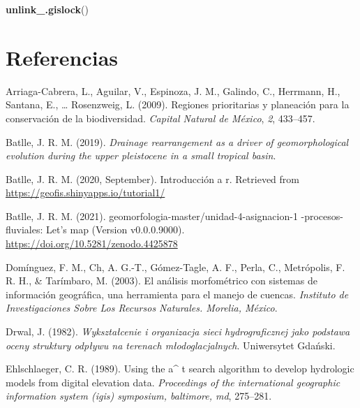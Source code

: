 \documentclass[11pt,]{article}
\newenvironment{Shaded}{\begin{snugshade}}{\end{snugshade}}
\newcommand{\KeywordTok}[1]{\textcolor[rgb]{0.13,0.29,0.53}{\textbf{#1}}}
\newcommand{\NormalTok}[1]{#1}
\begin{document}
\begin{Shaded}
\begin{Highlighting}[]
\KeywordTok{unlink_.gislock}\NormalTok{()}
\end{Highlighting}
\end{Shaded}

\section*{Referencias}\label{referencias}

\hypertarget{refs}{}
\hypertarget{ref-arriaga2009regiones}{}
Arriaga-Cabrera, L., Aguilar, V., Espinoza, J. M., Galindo, C.,
Herrmann, H., Santana, E., \ldots{} Rosenzweig, L. (2009). Regiones
prioritarias y planeación para la conservación de la biodiversidad.
\emph{Capital Natural de México}, \emph{2}, 433--457.

\hypertarget{ref-batlle2019drainage}{}
Batlle, J. R. M. (2019). \emph{Drainage rearrangement as a driver of
geomorphological evolution during the upper pleistocene in a small
tropical basin}.

\hypertarget{ref-joseramonmartinezbatlle2020}{}
Batlle, J. R. M. (2020, September). Introducción a r. Retrieved from
\url{https://geofis.shinyapps.io/tutorial1/}

\hypertarget{ref-jose_ramon_martinez_batlle_2021_4425878}{}
Batlle, J. R. M. (2021). geomorfologia-master/unidad-4-asignacion-1
-procesos-fluviales: Let's map (Version v0.0.0.9000).
\url{https://doi.org/10.5281/zenodo.4425878}

\hypertarget{ref-dominguez2003analisis}{}
Domínguez, F. M., Ch, A. G.-T., Gómez-Tagle, A. F., Perla, C.,
Metrópolis, F. R. H., \& Tarímbaro, M. (2003). El análisis morfométrico
con sistemas de información geográfica, una herramienta para el manejo
de cuencas. \emph{Instituto de Investigaciones Sobre Los Recursos
Naturales. Morelia, México}.

\hypertarget{ref-drwal1982wyksztalcenie}{}
Drwal, J. (1982). \emph{Wykształcenie i organizacja sieci
hydrograficznej jako podstawa oceny struktury odpływu na terenach
młodoglacjalnych}. Uniwersytet Gdański.

\hypertarget{ref-ehlschlaeger1989using}{}
Ehlschlaeger, C. R. (1989). Using the a\^{} t search algorithm to
develop hydrologic models from digital elevation data. \emph{Proceedings
of the international geographic information system (igis) symposium,
baltimore, md}, 275--281.
\end{document}
